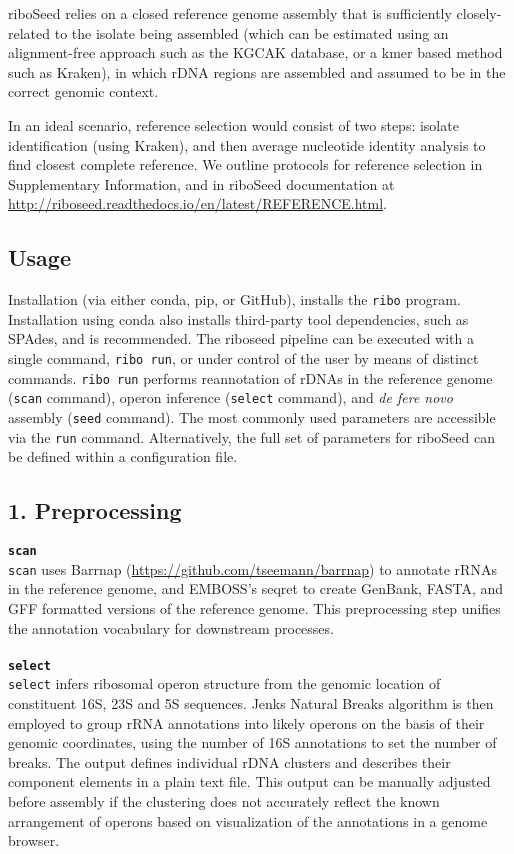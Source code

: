 \documentclass[a4,center,fleqn]{NAR}
\begin{document}
riboSeed relies on a closed reference genome assembly that is sufficiently closely-related to the isolate being assembled (which can be estimated using an alignment-free approach such as the KGCAK database\cite{Wang2015b}, or a kmer based method such as Kraken\cite{Wood2014}), in which rDNA regions are assembled and assumed to be in the correct genomic context.

In an ideal scenario, reference selection would consist of two steps:  isolate identification (using Kraken), and then average nucleotide identity analysis to find closest complete reference. We outline protocols for reference selection in Supplementary Information, and in riboSeed documentation at \url{http://riboseed.readthedocs.io/en/latest/REFERENCE.html}.

\subsection*{Usage}
Installation (via either conda, pip, or GitHub), installs the \texttt{ribo} program. Installation using conda also installs third-party tool dependencies, such as SPAdes, and is recommended. The riboseed pipeline can be executed with a single command, \texttt{ribo run}, or under control of the user by means of distinct commands. \texttt{ribo run} performs reannotation of rDNAs in the reference genome (\texttt{scan} command), operon inference (\texttt{select} command), and \textit{de fere novo} assembly (\texttt{seed} command).  The most commonly used parameters are accessible via the \texttt{run} command. Alternatively, the full set of parameters for riboSeed can be defined within a configuration file.

\subsection*{1. Preprocessing}

\textbf{\texttt{scan}}\\
\texttt{scan} uses Barrnap (\url{https://github.com/tseemann/barrnap}) to annotate rRNAs in the reference genome, and EMBOSS's seqret\cite{Rice2000a} to create GenBank, FASTA, and GFF formatted versions of the reference genome. This preprocessing step unifies the annotation vocabulary for downstream processes.\\
\\
\textbf{\texttt{select}}\\
\texttt{select} infers ribosomal operon structure from the genomic location of constituent 16S, 23S and 5S sequences. Jenks Natural Breaks algorithm is then employed to group rRNA annotations into likely operons on the basis of their genomic coordinates, using the number of 16S annotations to set the number of breaks. The output defines individual rDNA clusters and describes their component elements in a plain text file. This output can be manually adjusted before assembly if the clustering does not accurately reflect the known arrangement of operons based on visualization of the annotations in a genome browser.
\end{document}
